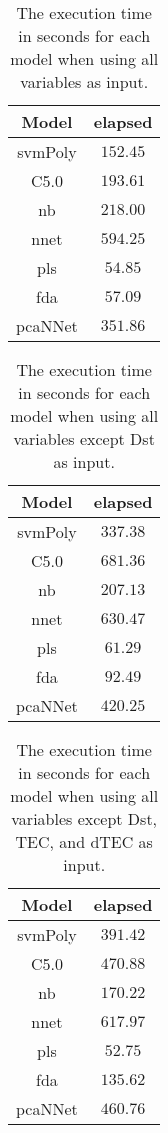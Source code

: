 \begin{table}[!ht]
	\centering
	\begin{tabular}{|c|c|}
		\hline
		Model & elapsed \\ \hline
		svmPoly & $152.45$ \\ \hline
		C5.0 & $193.61$ \\ \hline
		nb & $218.00$ \\ \hline
		nnet & $594.25$ \\ \hline
		pls & $54.85$ \\ \hline
		fda & $57.09$ \\ \hline
		pcaNNet & $351.86$ \\ \hline
	\end{tabular}
	\caption{The execution time in seconds for each model when using all variables as input.}
	\label{tab:time:all:total}
\end{table}

\begin{table}[!ht]
	\centering
	\begin{tabular}{|c|c|}
		\hline
		Model & elapsed \\ \hline
		svmPoly & $337.38$ \\ \hline
		C5.0 & $681.36$ \\ \hline
		nb & $207.13$ \\ \hline
		nnet & $630.47$ \\ \hline
		pls & $61.29$ \\ \hline
		fda & $92.49$ \\ \hline
		pcaNNet & $420.25$ \\ \hline
	\end{tabular}
	\caption{The execution time in seconds for each model when using all variables except Dst as input.}
	\label{tab:time:noDst:total}
\end{table}

\begin{table}[!ht]
	\centering
	\begin{tabular}{|c|c|}
		\hline
		Model & elapsed \\ \hline
		svmPoly & $391.42$ \\ \hline
		C5.0 & $470.88$ \\ \hline
		nb & $170.22$ \\ \hline
		nnet & $617.97$ \\ \hline
		pls & $52.75$ \\ \hline
		fda & $135.62$ \\ \hline
		pcaNNet & $460.76$ \\ \hline
	\end{tabular}
	\caption{The execution time in seconds for each model when using all variables except Dst, TEC, and dTEC as input.}
	\label{tab:time:noTEC:total}
\end{table}


